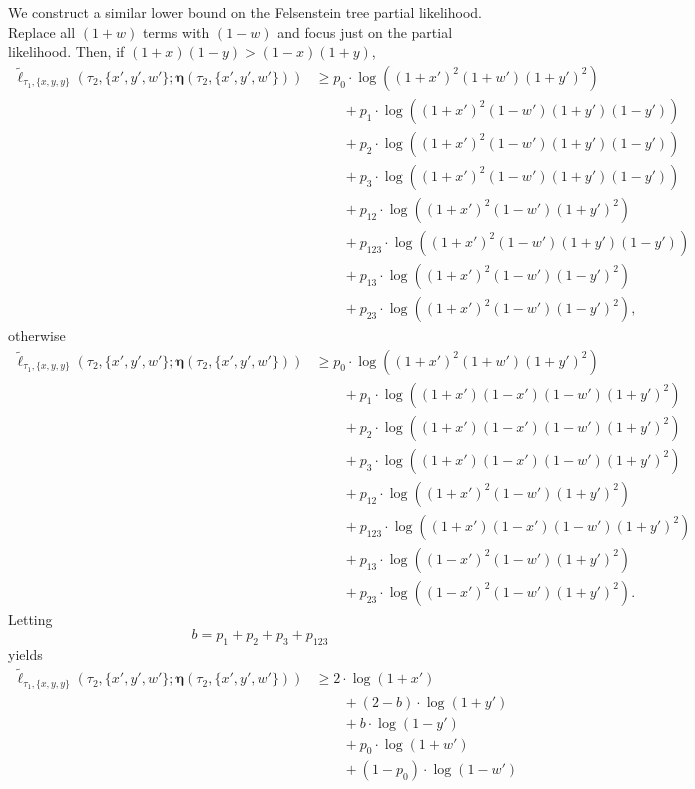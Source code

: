 \documentclass{article}
\newcommand{\fullAncestralSplitPartitions}{\boldsymbol\eta}
\begin{document}
We construct a similar lower bound on the Felsenstein tree partial likelihood.
Replace all $(1+w)$ terms with $(1-w)$ and focus just on the partial likelihood.
Then, if $(1+x)(1-y) > (1-x)(1+y)$,
\begin{align*}
    \tilde{\ell}_{\tau_1,\{x,y,y\}}(\tau_2, \{x',y',w'\}; \fullAncestralSplitPartitions(\tau_2,\{x',y',w'\}))
    &\ge      p_{0}  \cdot\log((1+x')^2   (1+w')(1+y')^2) \\
    &\qquad + p_{1}  \cdot\log((1+x')^2   (1-w')(1+y')(1-y')) \\
    &\qquad + p_{2}  \cdot\log((1+x')^2   (1-w')(1+y')(1-y')) \\
    &\qquad + p_{3}  \cdot\log((1+x')^2   (1-w')(1+y')(1-y')) \\
    &\qquad + p_{12} \cdot\log((1+x')^2   (1-w')(1+y')^2) \\
    &\qquad + p_{123}\cdot\log((1+x')^2   (1-w')(1+y')(1-y'))\\
    &\qquad + p_{13} \cdot\log((1+x')^2   (1-w')(1-y')^2) \\
    &\qquad + p_{23} \cdot\log((1+x')^2   (1-w')(1-y')^2),
\end{align*}
otherwise
\begin{align*}
    \tilde{\ell}_{\tau_1,\{x,y,y\}}(\tau_2, \{x',y',w'\}; \fullAncestralSplitPartitions(\tau_2,\{x',y',w'\}))
    &\ge      p_{0}  \cdot\log((1+x')^2    (1+w')(1+y')^2) \\
    &\qquad + p_{1}  \cdot\log((1+x')(1-x')(1-w')(1+y')^2) \\
    &\qquad + p_{2}  \cdot\log((1+x')(1-x')(1-w')(1+y')^2) \\
    &\qquad + p_{3}  \cdot\log((1+x')(1-x')(1-w')(1+y')^2) \\
    &\qquad + p_{12} \cdot\log((1+x')^2    (1-w')(1+y')^2) \\
    &\qquad + p_{123}\cdot\log((1+x')(1-x')(1-w')(1+y')^2)\\
    &\qquad + p_{13} \cdot\log((1-x')^2    (1-w')(1+y')^2) \\
    &\qquad + p_{23} \cdot\log((1-x')^2    (1-w')(1+y')^2).
\end{align*}
Letting
$$
b = p_{1}+p_{2}+p_{3}+p_{123}
$$
yields
\begin{align*}
    \tilde{\ell}_{\tau_1,\{x,y,y\}}(\tau_2, \{x',y',w'\}; \fullAncestralSplitPartitions(\tau_2,\{x',y',w'\}))
    &\ge      2\cdot\log(1+x') \\
    &\qquad + (2-b)  \cdot\log(1+y') \\
    &\qquad + b      \cdot\log(1-y') \\
    &\qquad + p_{0}\cdot\log(1+w') \\
    &\qquad + (1-p_{0})\cdot\log(1-w')
\end{align*}
\end{document}
